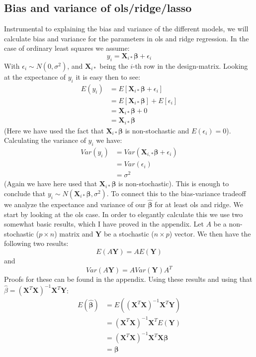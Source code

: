 \documentclass{article}
\begin{document}
\subsection{Bias and variance of ols/ridge/lasso}
Instrumental to explaining the bias and variance of the different models, we
will calculate bias and variance for the parameters in ols and ridge regression.
In the case of ordinary least squares we assume:
$$y_i = \mathbf{X}_{i *} \bm{\beta} + \epsilon_i$$
With $\epsilon_i \sim N(0, \sigma^2)$, and $\mathbf{X}_{i *}$ being the $i$-th
row in the design-matrix. Looking at the expectance of $y_i$ it is easy then to
see:
\begin{align*}
    E(y_i) & = E\left[ \mathbf{X}_{i *} \bm{\beta} + \epsilon_i \right]                 \\
           & = E\left[ \mathbf{X}_{i *} \bm{\beta} \right] + E\left[ \epsilon_i \right] \\
           & = \mathbf{X}_{i *} \bm{\beta} + 0                                          \\
           & = \mathbf{X}_{i *}\bm{\beta}
\end{align*}
(Here we have used the fact that $\mathbf{X}_{i *} \bm{\beta}$ is
non-stochastic and $E(\epsilon_i) = 0$). Calculating the variance of $y_i$ we
have:
\begin{align*}
    Var(y_i) & = Var(\mathbf{X}_{i, *} \bm{\beta} + \epsilon_i) \\
             & = Var(\epsilon_i)                                \\
             & = \sigma^2
\end{align*}
(Again we have here used that $\mathbf{X}_{i *} \mathbf{\beta}$ is non-stochastic).
This is enough to conclude that $y_i \sim N(\mathbf{X}_{i *} \mathbf{\beta},
    \sigma^2)$. To connect this to the bias-variance tradeoff we analyze the
expectance and variance of our $\hat{\bm{\beta}}$ for at least ols and ridge. We
start by looking at the ols case. In order to elegantly calculate this we use
two somewhat basic results, which I have proved in the appendix. Let
$A$ be a non-stochastic ($p\times n$) matrix and $\mathbf{Y}$ be a
stochastic ($n \times p$) vector. We then have the following two results:
$$E(A \mathbf{Y}) = A E(\mathbf{Y})$$
and
$$Var(A \mathbf{Y}) = A Var(\mathbf{Y}) A^T$$
Proofs for these can be found in the appendix. Using these results and using
that $\hat{\beta} = (\mathbf{X}^T \mathbf{X})^{-1} \mathbf{X}^T \mathbf{Y}$:
\begin{align*}
    E(\hat{\bm{\beta}}) & = E((\mathbf{X}^T \mathbf{X})^{-1} \mathbf{X}^T \mathbf{Y})         \\
                        & = (\mathbf{X}^T \mathbf{X})^{-1} \mathbf{X}^T E(\mathbf{Y})         \\
                        & = (\mathbf{X}^T \mathbf{X})^{-1} \mathbf{X}^T \mathbf{X} \bm{\beta} \\
                        & = \bm{\beta}
\end{align*}
\end{document}
